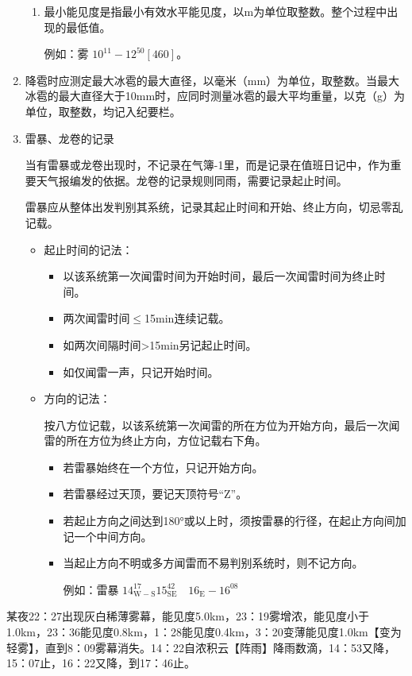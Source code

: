 ﻿\documentclass[UTF8,11pt]{ctexbook}%
\begin{document}
\begin{enumerate}
\begin{enumerate}
		\item 最小能见度是指最小有效水平能见度，以m为单位取整数。整个过程中出现的最低值。\par\qquad
		例如：雾 \(10^{11}-12^{50}[460]\)。
	\end{enumerate}
	\item 降雹时应测定最大冰雹的最大直径，以毫米（mm）为单位，取整数。当最大冰雹的最大直径大于10mm时，应同时测量冰雹的最大平均重量，以克（g）为单位，取整数，均记入纪要栏。
	\item 雷暴、龙卷的记录\par\qquad
	当有雷暴或龙卷出现时，不记录在气簿-1里，而是记录在值班日记中，作为重要天气报编发的依据。龙卷的记录规则同雨，需要记录起止时间。\par\qquad
	雷暴应从整体出发判别其系统，记录其起止时间和开始、终止方向，切忌零乱记载。
	\begin{itemize}
		\item 起止时间的记法：
		\begin{itemize}
			\item 以该系统第一次闻雷时间为开始时间，最后一次闻雷时间为终止时间。
			\item 两次闻雷时间\(\leq\)15min连续记载。
			\item 如两次间隔时间>15min另记起止时间。
			\item 如仅闻雷一声，只记开始时间。
		\end{itemize}
		\item 方向的记法：\par\qquad
		按八方位记载，以该系统第一次闻雷的所在方位为开始方向，最后一次闻雷的所在方位为终止方向，方位记载右下角。
		\begin{itemize}
			\item 若雷暴始终在一个方位，只记开始方向。
			\item 若雷暴经过天顶，要记天顶符号“Z”。
			\item 若起止方向之间达到180°或以上时，须按雷暴的行径，在起止方向间加记一个中间方向。
			\item 当起止方向不明或多方闻雷而不易判别系统时，则不记方向。\par\qquad
			例如：雷暴 \(14^{17}_{\mathrm{W-S}}15^{42}_{\mathrm{SE}}\quad 16_\mathrm{E}-16^{08}\)
		\end{itemize}
	\end{itemize}
\end{enumerate}

某夜22：27出现灰白稀薄雾幕，能见度5.0km，23：19雾增浓，能见度小于1.0km，23：36能见度0.8km，1：28能见度0.4km，3：20变薄能见度1.0km【变为轻雾】，直到8：09雾幕消失。14：22自浓积云【阵雨】降雨数滴，14：53又降，15：07止，16：22又降，到17：46止。 
\end{document}
